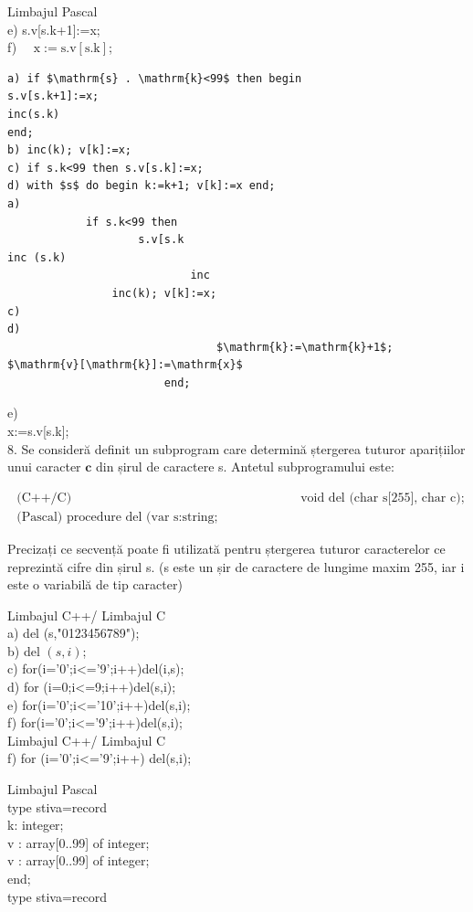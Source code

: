 \documentclass[10pt]{article}
\begin{document}
Limbajul Pascal\\[0pt]
e) s.v[s.k+1]:=x;\\
f) $\quad \mathrm{x}:=\mathrm{s} . \mathrm{v}[\mathrm{s} . \mathrm{k}]$;

\begin{verbatim}
a) if $\mathrm{s} . \mathrm{k}<99$ then begin
s.v[s.k+1]:=x;
inc(s.k)
end;
b) inc(k); v[k]:=x;
c) if s.k<99 then s.v[s.k]:=x;
d) with $s$ do begin k:=k+1; v[k]:=x end;
a)
            if s.k<99 then
                    s.v[s.k
inc (s.k)
                            inc
                inc(k); v[k]:=x;
c)
d)
                                $\mathrm{k}:=\mathrm{k}+1$; $\mathrm{v}[\mathrm{k}]:=\mathrm{x}$
                        end;
\end{verbatim}

e)\\[0pt]
x:=s.v[s.k];\\
8. Se consideră definit un subprogram care determină ștergerea tuturor aparițiilor unui caracter $\mathbf{c}$ din șirul de caractere s. Antetul subprogramului este:

$$
\begin{array}{ll}
\text { (C++/C) } & \text { void del (char s[255], char c); } \\
\text { (Pascal) procedure del (var s:string; c:character); }
\end{array}
$$

Precizați ce secvență poate fi utilizată pentru ștergerea tuturor caracterelor ce reprezintă cifre din șirul s. (s este un șir de caractere de lungime maxim 255, iar i este o variabilă de tip caracter)

Limbajul C++/ Limbajul C\\
a) del (s,"0123456789");\\
b) del $(s, i)$;\\
c) for(i='0';i<='9';i++)del(i,s);\\
d) for (i=0;i<=9;i++)del(s,i);\\
e) for(i='0';i<='10';i++)del(s,i);\\
f) for(i='0';i<='9';i++)del(s,i);\\
Limbajul C++/ Limbajul C\\
f) for (i='0';i<='9';i++) del(s,i);

Limbajul Pascal\\
type stiva=record\\
k: integer;\\[0pt]
v : array[0..99] of integer;\\[0pt]
v : array[0..99] of integer;\\
end;\\
type stiva=record
\end{document}
